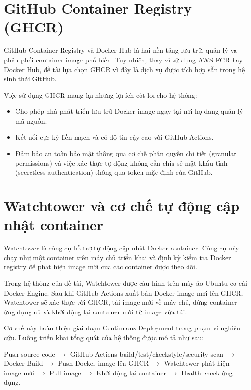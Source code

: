\documentclass[12pt,a4paper,oneside]{extreport}
\begin{document}
\section{GitHub Container Registry (GHCR)}
GitHub Container Registry và Docker Hub là hai nền tảng lưu trữ, quản lý và
phân phối container image phổ biến. Tuy nhiên, thay vì sử dụng AWS ECR hay
Docker Hub, đề tài lựa chọn GHCR vì đây là dịch vụ được tích hợp sẵn trong hệ
sinh thái GitHub.

Việc sử dụng GHCR mang lại những lợi ích cốt lõi cho hệ thống:
\begin{itemize}
  \item Cho phép nhà phát triển lưu trữ Docker image ngay tại nơi họ đang quản lý
  mã nguồn.
  \item Kết nối cực kỳ liền mạch và có độ tin cậy cao với GitHub Actions.
  \item Đảm bảo an toàn bảo mật thông qua cơ chế phân quyền chi tiết (granular
  permissions) và việc xác thực tự động không cần chia sẻ mật khẩu tĩnh
  (secretless authentication) thông qua token mặc định của GitHub.
\end{itemize}

\section{Watchtower và cơ chế tự động cập nhật container}
Watchtower là công cụ hỗ trợ tự động cập nhật Docker container. Công cụ này
chạy như một container trên máy chủ triển khai và định kỳ kiểm tra Docker
registry để phát hiện image mới của các container được theo dõi.

Trong hệ thống của đề tài, Watchtower được cấu hình trên máy ảo Ubuntu có cài
Docker Engine. Sau khi GitHub Actions xuất bản Docker image mới lên GHCR,
Watchtower sẽ xác thực với GHCR, tải image mới về máy chủ, dừng container ứng
dụng cũ và khởi động lại container mới từ image vừa tải.

Cơ chế này hoàn thiện giai đoạn Continuous Deployment trong phạm vi nghiên cứu.
Luồng triển khai tổng quát của hệ thống được mô tả như sau:

\begin{center}
  \begin{minipage}{0.92\textwidth}
    \raggedright
    Push source code $\rightarrow$ GitHub Actions
    build/test/checkstyle/security scan $\rightarrow$ Docker Build
    $\rightarrow$ Push Docker image lên GHCR $\rightarrow$ Watchtower phát hiện
    image mới $\rightarrow$ Pull image $\rightarrow$ Khởi động lại container
    $\rightarrow$ Health check ứng dụng.
  \end{minipage}
\end{center}
\end{document}

